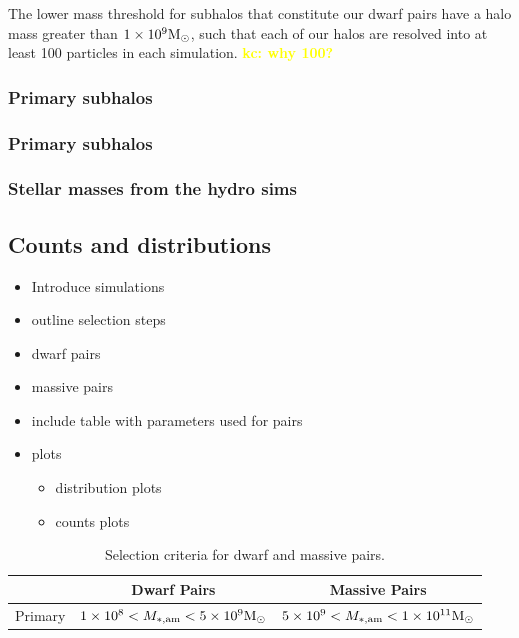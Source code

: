 \documentclass[twocolumn]{aastex631}
\newcommand{\kc}[1]{\textcolor{yellow}{\textbf{kc: #1}} }
\begin{document}
The lower mass threshold for subhalos that constitute our dwarf pairs have a halo mass greater than $1\times10^9\mathrm{M}_\odot$, such that each of our halos are resolved into at least 100 particles in each simulation.  
\kc{why 100?} 

\subsubsection{Primary subhalos}\label{sec:methods-crit-prims}

\subsubsection{Primary subhalos}\label{sec:methods-crit-pairs}

\subsubsection{Stellar masses from the hydro sims}


\subsection{Counts and distributions}\label{sec:methods-counts}

\begin{itemize}
  \item Introduce simulations
  \item outline selection steps
  \item dwarf pairs
  \item massive pairs
  \item include table with parameters used for pairs
  \item plots
    \begin{itemize}
      \item distribution plots
      \item counts plots
    \end{itemize}
\end{itemize}


\begin{table}[htb]
  \centering
    \begin{tabular}{lcc}
     & Dwarf Pairs & Massive Pairs \\\hline\hline
    Primary &$1\times10^{8} < M_{*,\mathrm{am}} < 5\times10^{9} \mathrm{M}_\odot$ & $5\times10^{9} < M_{*,\mathrm{am}} < 1\times10^{11} \mathrm{M}_\odot$\\\hline
    \end{tabular}
    \caption{\label{table:mass}Selection criteria for dwarf and massive pairs.}
    \end{table}
\end{document}
